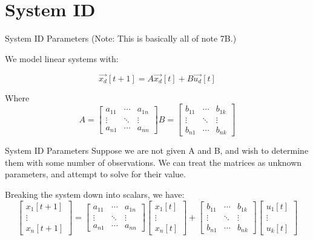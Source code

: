\section{System ID}

\begin{frame}{System ID Parameters}
	(Note: This is basically all of note 7B.)
	
    We model linear systems with:

    \[
        \vec{x_d}[t+1] = A\vec{x_d}[t] + B\vec{u_d}[t]
    \]
        
    Where 
   	\[
		A = 
		\begin{bmatrix}
			a_{11} & \cdots & a_{1n} \\
			\vdots & \ddots & \vdots \\
			a_{n1} & \cdots & a_{nn}     
		\end{bmatrix}
		B = 
		\begin{bmatrix}
			b_{11} & \cdots & b_{1k} \\
			\vdots & \ddots & \vdots \\
			b_{n1} & \cdots & b_{nk}     
		\end{bmatrix}        
    \]
\end{frame}
	
\begin{frame}{System ID Parameters}
	Suppose we are not given A and B, and wish to determine them with some number of observations. We can treat the matrices as unknown parameters, and attempt to solve for their value. 
	
	Breaking the system down into scalars, we have:
	\[
		\begin{bmatrix}
			x_1[t+1] \\
			\vdots \\
			x_n[t+1] 
		\end{bmatrix}
		=
		\begin{bmatrix}
			a_{11} & \cdots & a_{1n} \\
			\vdots & \ddots & \vdots \\
			a_{n1} & \cdots & a_{nn}     
		\end{bmatrix}
		\begin{bmatrix}
			x_1[t] \\
			\vdots \\
			x_n[t] 
		\end{bmatrix}
		+
		\begin{bmatrix}
			b_{11} & \cdots & b_{1k} \\
			\vdots & \ddots & \vdots \\
			b_{n1} & \cdots & b_{nk}     
		\end{bmatrix}        
		\begin{bmatrix}
			u_1[t] \\
			\vdots \\
			u_k[t] 
		\end{bmatrix}
    \]
\end{frame}


